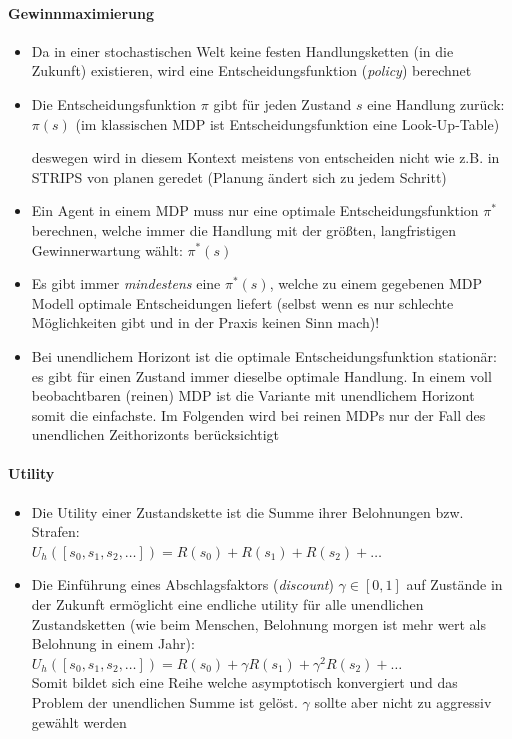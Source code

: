 \paragraph{Gewinnmaximierung}
\begin{itemize}
	\item Da in einer stochastischen Welt keine festen Handlungsketten (in die Zukunft) existieren, wird eine Entscheidungsfunktion (\emph{policy}) berechnet
	\item Die Entscheidungsfunktion $\pi$ gibt f\"ur jeden Zustand $s$ eine Handlung zur\"uck: $\pi(s)$ (im klassischen MDP ist Entscheidungsfunktion eine Look-Up-Table)
	\begin{itemize}
		\ita deswegen wird in diesem Kontext meistens von \glqq entscheiden\grqq{} nicht wie z.B. in STRIPS von \glqq planen\grqq{} geredet (Planung ändert sich zu jedem Schritt)
	\end{itemize}
	\item Ein Agent in einem MDP muss nur eine optimale Entscheidungsfunktion $\pi^*$ berechnen, welche immer die Handlung mit der gr\"o{\ss}ten, langfristigen Gewinnerwartung w\"ahlt: $\pi^* (s)$
	\item Es gibt immer \textit{mindestens} eine $\pi^* (s)$, welche zu einem gegebenen MDP Modell optimale Entscheidungen liefert (selbst wenn es nur schlechte Möglichkeiten gibt und in der Praxis keinen Sinn mach)!
	\item Bei unendlichem Horizont ist die optimale Entscheidungsfunktion station\"ar: es gibt f\"ur einen Zustand immer dieselbe optimale Handlung. In einem voll beobachtbaren (reinen) MDP ist die Variante mit unendlichem Horizont somit die einfachste. Im Folgenden wird bei reinen MDPs nur der Fall des unendlichen Zeithorizonts ber\"ucksichtigt
\end{itemize}

\paragraph{Utility}
\begin{itemize}
	\item Die Utility einer Zustandskette ist die Summe ihrer Belohnungen bzw. Strafen:\\ $U_h(\left[s_0, s_1, s_2, \ldots \right]) = R(s_0) + R(s_1) + R(s_2) + \ldots$
	\item Die Einf\"uhrung eines Abschlagsfaktors (\emph{discount})  $\gamma \in \left[0,1\right]$ auf Zust\"ande  in der Zukunft erm\"oglicht eine endliche utility f\"ur alle unendlichen Zustandsketten (wie beim Menschen, Belohnung morgen ist mehr wert als Belohnung in einem Jahr):\\ $U_h(\left[s_0, s_1, s_2, \ldots \right]) = R(s_0) + \gamma R(s_1) + \gamma^2 R(s_2) + \ldots$\\
	Somit bildet sich eine Reihe welche asymptotisch konvergiert und das Problem der unendlichen Summe ist gelöst. $\gamma$ sollte aber nicht zu aggressiv gewählt werden
\end{itemize}

